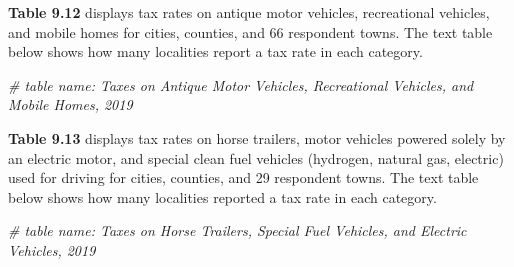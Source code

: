 \documentclass[
]{book}
\newenvironment{Shaded}{\begin{snugshade}}{\end{snugshade}}
\newcommand{\CommentTok}[1]{\textcolor[rgb]{0.56,0.35,0.01}{\textit{#1}}}
\begin{document}
\textbf{Table 9.12} displays tax rates on antique motor vehicles, recreational vehicles, and mobile homes for cities, counties, and 66 respondent towns. The text table below shows how many localities report a tax rate in each category.

\begin{Shaded}
\begin{Highlighting}[]
\CommentTok{\# table name: Taxes on Antique Motor Vehicles, Recreational Vehicles, and Mobile Homes, 2019}
\end{Highlighting}
\end{Shaded}

\textbf{Table 9.13} displays tax rates on horse trailers, motor vehicles powered solely by an electric motor, and special clean fuel vehicles (hydrogen, natural gas, electric) used for driving for cities, counties, and 29 respondent towns. The text table below shows how many localities reported a tax rate in each category.

\begin{Shaded}
\begin{Highlighting}[]
\CommentTok{\# table name: Taxes on Horse Trailers, Special Fuel Vehicles, and Electric Vehicles, 2019}
\end{Highlighting}
\end{Shaded}
\end{document}
